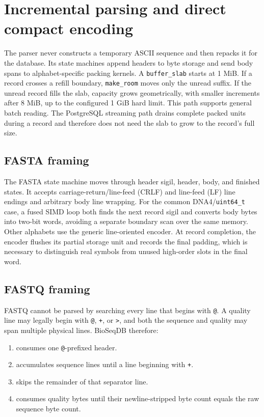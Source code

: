 \section{Incremental parsing and direct compact encoding}
\label{sec:io-parsing}

The parser never constructs a temporary ASCII sequence and then repacks it for
the database.  Its state machines append headers to byte storage and send body
spans to alphabet-specific packing kernels. A \texttt{buffer\_slab} starts at
1 MiB. If a record crosses a refill boundary, \texttt{make\_room} moves only
the unread suffix. If the unread record fills the slab, capacity grows
geometrically, with smaller increments after 8 MiB, up to the configured 1 GiB
hard limit.  This path supports general batch reading.  The PostgreSQL
streaming path drains complete packed units during a record and therefore does
not need the slab to grow to the record's full size.

\subsection{FASTA framing}

The FASTA state machine moves through header sigil, header, body, and finished
states.  It accepts carriage-return/line-feed (CRLF) and line-feed (LF) line
endings and arbitrary body line wrapping.
For the common DNA4/\texttt{uint64\_t} case, a fused SIMD loop both finds the
next record sigil and converts body bytes into two-bit words, avoiding a
separate boundary scan over the same memory.  Other alphabets use the generic
line-oriented encoder.  At record completion, the encoder flushes its partial
storage unit and records the final padding, which is necessary to distinguish
real symbols from unused high-order slots in the final word.

\subsection{FASTQ framing}

FASTQ cannot be parsed by searching every line that begins with
\texttt{@}.  A quality line may legally begin with \texttt{@},
\texttt{+}, or \texttt{>}, and both the sequence and quality may span
multiple physical lines.  BioSeqDB therefore:

\begin{enumerate}
    \item consumes one \texttt{@}-prefixed header.
    \item accumulates sequence lines until a line beginning with
    \texttt{+}.
    \item skips the remainder of that separator line.
    \item consumes quality bytes until their newline-stripped byte count equals
    the raw sequence byte count.
\end{enumerate}

